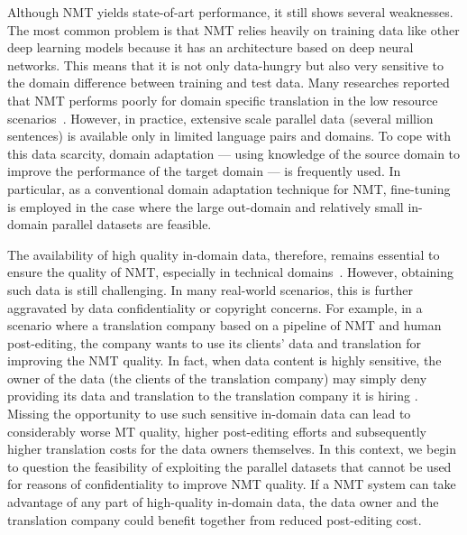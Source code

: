 Although NMT yields state-of-art performance, it still shows several weaknesses. The most common problem is that NMT relies heavily on training data like other deep learning models because it has an architecture based on deep neural networks. This means that it is not only data-hungry but also very sensitive to the domain difference between training and test data. Many researches reported that NMT performs poorly for domain specific translation in the low resource scenarios~\parencite{zoph2016transfer, koehn-knowles-2017-six, ostling2017neural, sato-etal-2020-vocabulary}. However, in practice, extensive scale parallel data (several million sentences) is available only in limited language pairs and domains. To cope with this data scarcity, domain adaptation --- using knowledge of the source domain to improve the performance of the target domain --- is frequently used.
In particular, as a conventional domain adaptation technique for NMT, fine-tuning~\parencite{freitag2016fast, chu-etal-2017-empirical} is employed in the case where the large out-domain and relatively small in-domain parallel datasets are feasible.

The availability of high quality in-domain data, therefore, remains essential to ensure the quality of NMT, especially in technical domains~\parencite{koehn-knowles-2017-six}. However, obtaining such data is still challenging. In many real-world scenarios, this is further aggravated by data confidentiality or copyright concerns. For example, in a scenario where a translation company based on a pipeline of NMT and human post-editing, the company wants to use its clients' data and translation for improving the NMT quality. In fact, when data content is highly sensitive, the owner of the data (the clients of the translation company) may simply deny providing its data and translation to the translation company it is hiring \parencite{cancedda-2012-private}. Missing the opportunity to use such sensitive in-domain data can lead to considerably worse MT quality, higher post-editing efforts and subsequently higher translation costs for the data owners themselves. In this context, we begin to question the feasibility of exploiting the parallel datasets that cannot be used for reasons of confidentiality to improve NMT quality. If a NMT system can take advantage of any part of high-quality in-domain data, the data owner and the translation company could benefit together from reduced post-editing cost. 


